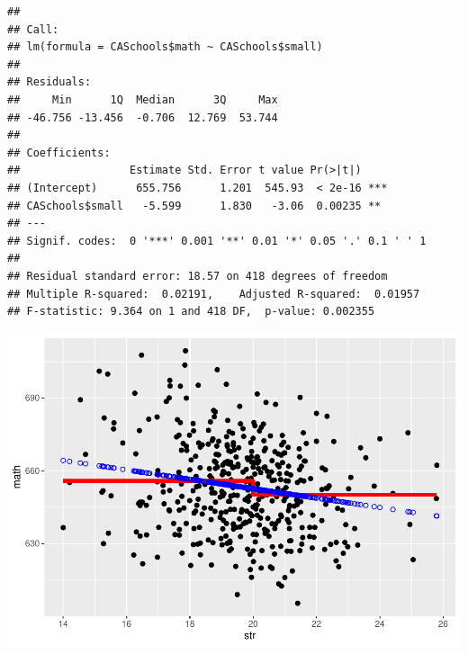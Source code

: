 \documentclass[
]{book}
\newenvironment{Shaded}{\begin{snugshade}}{\end{snugshade}}
\newcommand{\DataTypeTok}[1]{\textcolor[rgb]{0.13,0.29,0.53}{#1}}
\newcommand{\DecValTok}[1]{\textcolor[rgb]{0.00,0.00,0.81}{#1}}
\newcommand{\KeywordTok}[1]{\textcolor[rgb]{0.13,0.29,0.53}{\textbf{#1}}}
\newcommand{\NormalTok}[1]{#1}
\newcommand{\OperatorTok}[1]{\textcolor[rgb]{0.81,0.36,0.00}{\textbf{#1}}}
\newcommand{\StringTok}[1]{\textcolor[rgb]{0.31,0.60,0.02}{#1}}
\begin{document}
\begin{verbatim}
## 
## Call:
## lm(formula = CASchools$math ~ CASchools$small)
## 
## Residuals:
##     Min      1Q  Median      3Q     Max 
## -46.756 -13.456  -0.706  12.769  53.744 
## 
## Coefficients:
##                 Estimate Std. Error t value Pr(>|t|)    
## (Intercept)      655.756      1.201  545.93  < 2e-16 ***
## CASchools$small   -5.599      1.830   -3.06  0.00235 ** 
## ---
## Signif. codes:  0 '***' 0.001 '**' 0.01 '*' 0.05 '.' 0.1 ' ' 1
## 
## Residual standard error: 18.57 on 418 degrees of freedom
## Multiple R-squared:  0.02191,    Adjusted R-squared:  0.01957 
## F-statistic: 9.364 on 1 and 418 DF,  p-value: 0.002355
\end{verbatim}

\begin{Shaded}
\end{Shaded}

\includegraphics{Metrics_files/figure-latex/unnamed-chunk-21-2.pdf}
\end{document}
